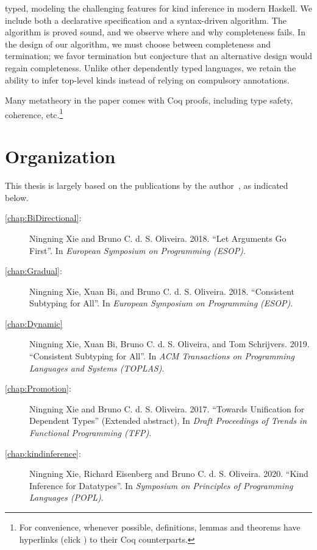 \begin{description}
\begin{itemize}
\begin{itemize}
      typed, modeling the challenging features for kind inference in modern
      Haskell. We include both a declarative specification and a syntax-driven
      algorithm. The algorithm is proved sound, and we observe where and why
      completeness fails. In the design of our algorithm, we must choose between
      completeness and termination; we favor termination but conjecture that an
      alternative design would regain completeness. Unlike other dependently typed
      languages, we retain the ability to infer top-level kinds instead of relying
      on compulsory annotations.
    \end{itemize}
  \end{itemize}
\end{description}

Many metatheory in the paper comes with Coq proofs, including type safety,
coherence, etc.\footnote{For convenience, whenever possible, definitions, lemmas
  and theorems have hyperlinks (click \leftpointright) to their Coq
  counterparts. }

\section{Organization}

This thesis is largely based on the
publications by the author~\citep{esop2018:arguments,esop2018:consistent,toplas:consistent,popl:kind,tfp},
as indicated below.
\begin{description}
\item[\cref{chap:BiDirectional}:] Ningning Xie and Bruno C. d. S.
  Oliveira. 2018. ``Let Arguments Go First''. In
  \emph{European Symposium on Programming (ESOP)}.
\item[\cref{chap:Gradual}:] Ningning Xie, Xuan Bi, and Bruno C. d. S.
  Oliveira. 2018. ``Consistent Subtyping for All''. In
  \emph{European Symposium on Programming (ESOP)}.
\item[\cref{chap:Dynamic}] Ningning Xie, Xuan Bi, Bruno C. d. S.
  Oliveira, and Tom Schrijvers. 2019. ``Consistent Subtyping for All''. In
  \emph{ACM Transactions on Programming Languages and Systems (TOPLAS)}.
\item[\cref{chap:Promotion}:]
  Ningning Xie and Bruno C. d. S. Oliveira.
  2017. ``Towards Unification for Dependent Types'' (Extended abstract), In \emph{Draft Proceedings
    of Trends in Functional Programming (TFP)}.
\item[\cref{chap:kindinference}:]
  Ningning Xie, Richard Eisenberg and Bruno C. d. S. Oliveira. 2020. ``Kind
  Inference for Datatypes''. In \emph{Symposium on Principles of Programming
    Languages (POPL)}.
\end{description}


\noindent\makebox[\linewidth]{\rule{0.7\textwidth}{0.4pt}}

\vspace{1.5\baselineskip}



